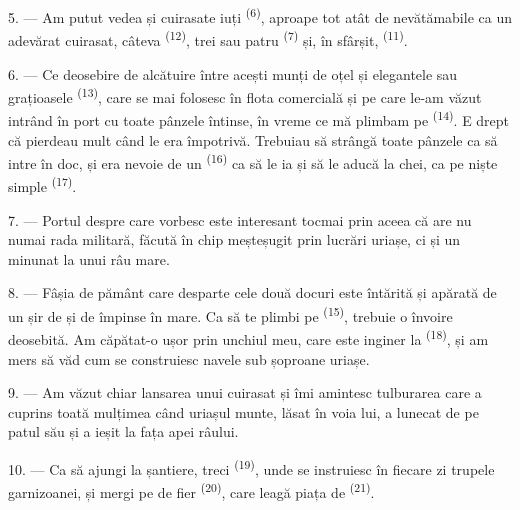 5. --- Am putut vedea și  cuirasate iuți
\textsuperscript{(6)}, aproape tot atât de nevătămabile ca un adevărat cuirasat,
câteva  \textsuperscript{(12)}, trei sau patru
 \textsuperscript{(7)} și, în sfârșit, 
\textsuperscript{(11)}. 

6. --- Ce deosebire de alcătuire între acești munți de oțel și elegantele
 sau grațioasele 
\textsuperscript{(13)}, care se mai folosesc în flota comercială și pe care le-am
văzut intrând în port cu toate pânzele întinse, în vreme ce mă plimbam pe
 \textsuperscript{(14)}. E drept că pierdeau mult când 
le era împotrivă. Trebuiau să strângă toate pânzele ca să intre în doc, și era
nevoie de un  \textsuperscript{(16)} ca să le ia și să le aducă
la chei, ca pe niște simple  \textsuperscript{(17)}.

\VUsaut{3.0mm}
\VUsaut{3.0mm}

7. --- Portul despre care vorbesc este interesant tocmai prin aceea că are nu numai
rada militară, făcută în chip meșteșugit prin lucrări uriașe, ci și un minunat
 la  unui râu mare.

8. --- Fâșia de pământ care desparte cele două docuri este întărită și apărată de
un șir de  și de  împinse în mare. Ca să te
plimbi pe  \textsuperscript{(15)}, trebuie o învoire deosebită. Am
căpătat-o ușor prin unchiul meu, care este inginer la 
\textsuperscript{(18)}, și am mers să văd cum se construiesc navele sub șoproane
uriașe.

9. --- Am văzut chiar lansarea unui cuirasat și îmi amintesc tulburarea care a
cuprins toată mulțimea când uriașul munte, lăsat în voia lui, a lunecat de pe
patul său și a ieșit la fața apei râului.

10. --- Ca să ajungi la șantiere, treci 
\textsuperscript{(19)}, unde se instruiesc în fiecare zi trupele garnizoanei, și
mergi pe  de fier \textsuperscript{(20)}, care leagă piața de
 \textsuperscript{(21)}.

\VUsaut{3.0mm}
\VUsaut{3.0mm}

